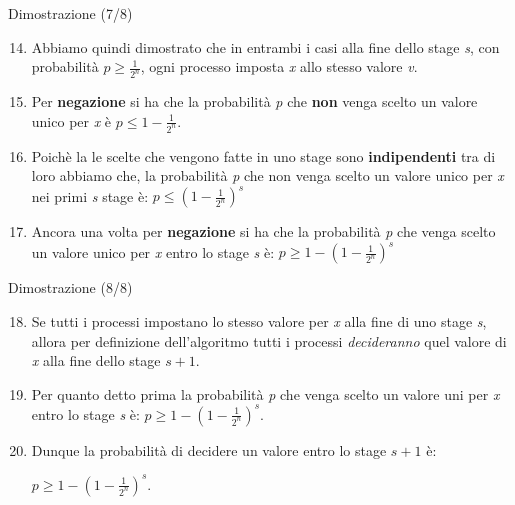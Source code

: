 \documentclass{beamer}
\begin{document}
\begin{frame}{Dimostrazione (7/8)}
    \begin{enumerate}
        \setcounter{enumi}{13}
        \item Abbiamo quindi dimostrato che in entrambi i casi alla fine dello stage \textit{s}, con probabilità $p \geq \frac{1}{2^n}$, ogni processo imposta \textit{x} allo stesso valore \textit{v}.
        \item Per \textbf{negazione} si ha che la probabilità \textit{p} che \textbf{non} venga scelto un valore unico per \textit{x} è $p \leq 1 - \frac{1}{2^n}$.
        \item Poichè la le scelte che vengono fatte in uno stage sono \textbf{indipendenti} tra di loro abbiamo che, la probabilità \textit{p} che non venga scelto un valore unico per \textit{x} nei primi \textit{s} stage è: $p \leq (1 - \frac{1}{2^n})^s$
        \item Ancora una volta per \textbf{negazione} si ha che la probabilità \textit{p} che venga scelto un valore unico per \textit{x} entro lo stage \textit{s} è: $p \geq 1 - (1 - \frac{1}{2^n})^s$ 
    \end{enumerate}
\end{frame}

\begin{frame}{Dimostrazione (8/8)}
    \begin{enumerate}
        \setcounter{enumi}{17}
        \item Se tutti i processi impostano lo stesso valore per \textit{x} alla fine di uno stage \textit{s}, allora per definizione dell'algoritmo tutti i processi \textit{decideranno} quel valore di \textit{x} alla fine dello stage $s + 1$.
        \item Per quanto detto prima la probabilità \textit{p} che venga scelto un valore uni per \textit{x} entro lo stage \textit{s} è: $p \geq 1 - (1 - \frac{1}{2^n})^s$. 
        \item Dunque la probabilità di decidere un valore entro lo stage $s + 1$ è:
        \begin{center}
            \Large
            $p \geq 1 - (1 - \frac{1}{2^n})^s$.
        \end{center}
    \end{enumerate}
\end{frame}
\end{document}
